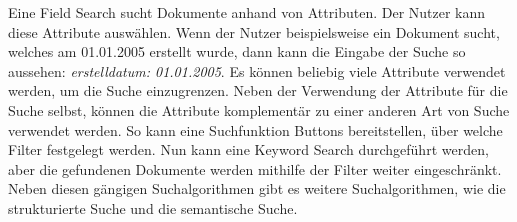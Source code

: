 Eine Field Search sucht Dokumente anhand von Attributen.
Der Nutzer kann diese Attribute auswählen.
Wenn der Nutzer beispielsweise ein Dokument sucht, welches am 01.01.2005 erstellt wurde, dann kann die Eingabe der Suche so aussehen: \textit{erstelldatum: 01.01.2005}.
Es können beliebig viele Attribute verwendet werden, um die Suche einzugrenzen.
Neben der Verwendung der Attribute für die Suche selbst, können die Attribute komplementär zu einer anderen Art von Suche verwendet werden.
So kann eine Suchfunktion Buttons bereitstellen, über welche Filter festgelegt werden.
Nun kann eine Keyword Search durchgeführt werden, aber die gefundenen Dokumente werden mithilfe der Filter weiter eingeschränkt.
Neben diesen gängigen Suchalgorithmen gibt es weitere Suchalgorithmen, wie die strukturierte Suche und die semantische Suche.